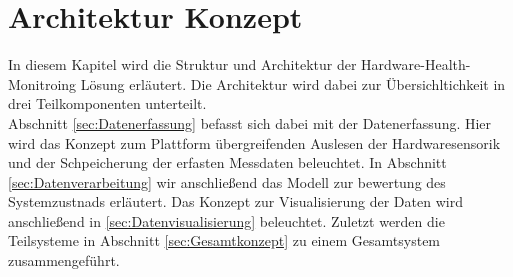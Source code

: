 \chapter{Architektur Konzept}
In diesem Kapitel wird die Struktur und Architektur der Hardware-Health-Monitroing Lösung erläutert. Die Architektur wird dabei zur Übersichltichkeit in drei Teilkomponenten unterteilt.\\
Abschnitt \ref{sec:Datenerfassung} befasst sich dabei mit der Datenerfassung. Hier wird das Konzept zum Plattform übergreifenden Auslesen der Hardwaresensorik und der Schpeicherung der erfasten Messdaten beleuchtet. In Abschnitt \ref{sec:Datenverarbeitung} wir anschließend das Modell zur bewertung des Systemzustnads erläutert. Das Konzept zur Visualisierung der Daten wird anschließend in \ref{sec:Datenvisualisierung} beleuchtet. Zuletzt werden die Teilsysteme in Abschnitt \ref{sec:Gesamtkonzept} zu einem Gesamtsystem zusammengeführt. 

